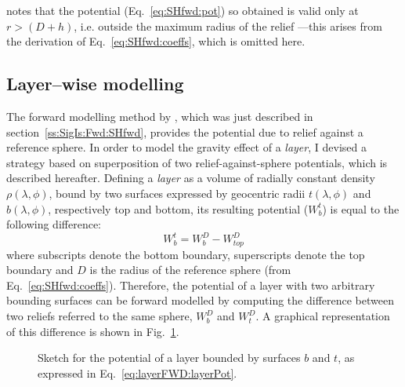 \Textcite{Wieczorek2007} notes that the potential (Eq.~\ref{eq:SHfwd:pot}) so obtained is valid only at $r > (D + h)$, i.e. outside the maximum radius of the relief ---this arises from the derivation of Eq.~\ref{eq:SHfwd:coeffs}, which is omitted here.


\subsection{Layer--wise modelling}
\label{ss:SigIs:Fwd:LayerFwd}
The forward modelling method by \textcite{Wieczorek2007}, which was just described in section~\ref{ss:SigIs:Fwd:SHfwd}, provides the potential due to relief against a reference sphere.
In order to model the gravity effect of a \textit{layer}, I devised a strategy based on superposition of two relief-against-sphere potentials, which is described hereafter.
Defining a \textit{layer} as a volume of radially constant density $\rho(\lambda, \phi)$, bound by two surfaces expressed by geocentric radii $t(\lambda, \phi)$ and $b(\lambda, \phi)$, respectively top and bottom, its resulting potential ($W_{b}^{t}$) is equal to the following difference:
\begin{equation}
    \label{eq:layerFWD:layerPot}
    W_{b}^{t} = W_{b}^{D} - W_{top}^{D}
\end{equation}
where subscripts denote the bottom boundary, superscripts denote the top boundary and $D$ is the radius of the reference sphere (from Eq.~\ref{eq:SHfwd:coeffs}).
Therefore, the potential of a layer with two arbitrary bounding surfaces can be forward modelled by computing the difference between two reliefs referred to the same sphere, $W_{b}^{D}$ and $W_{t}^{D}$.
A graphical representation of this difference is shown in Fig.~\ref{fig:SigIs:LayerDifference}.

\begin{figure}
    \begin{adjustbox}{center}
    \end{adjustbox}
    \caption[Sketch for the potential of a layer.]{
        Sketch for the potential of a layer bounded by surfaces $b$ and $t$, as expressed in Eq.~\ref{eq:layerFWD:layerPot}.}
    \label{fig:SigIs:LayerDifference}
\end{figure}

